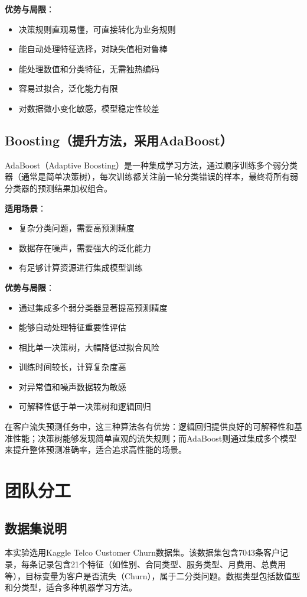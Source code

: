 \documentclass[12pt,a4paper]{article}
\begin{document}
\textbf{优势与局限}：
\begin{itemize}
    \item 决策规则直观易懂，可直接转化为业务规则
    \item 能自动处理特征选择，对缺失值相对鲁棒
    \item 能处理数值和分类特征，无需独热编码
    \item 容易过拟合，泛化能力有限
    \item 对数据微小变化敏感，模型稳定性较差
\end{itemize}

\subsection{Boosting（提升方法，采用AdaBoost）}
AdaBoost（Adaptive Boosting）是一种集成学习方法，通过顺序训练多个弱分类器（通常是简单决策树），每次训练都关注前一轮分类错误的样本，最终将所有弱分类器的预测结果加权组合。

\textbf{适用场景}：
\begin{itemize}
    \item 复杂分类问题，需要高预测精度
    \item 数据存在噪声，需要强大的泛化能力
    \item 有足够计算资源进行集成模型训练
\end{itemize}

\textbf{优势与局限}：
\begin{itemize}
    \item 通过集成多个弱分类器显著提高预测精度
    \item 能够自动处理特征重要性评估
    \item 相比单一决策树，大幅降低过拟合风险
    \item 训练时间较长，计算复杂度高
    \item 对异常值和噪声数据较为敏感
    \item 可解释性低于单一决策树和逻辑回归
\end{itemize}

在客户流失预测任务中，这三种算法各有优势：逻辑回归提供良好的可解释性和基准性能；决策树能够发现简单直观的流失规则；而AdaBoost则通过集成多个模型来提升整体预测准确率，适合追求高性能的场景。

\section{团队分工}

\subsection{数据集说明}
本实验选用Kaggle Telco Customer Churn数据集。该数据集包含7043条客户记录，每条记录包含21个特征（如性别、合同类型、服务类型、月费用、总费用等），目标变量为客户是否流失（Churn），属于二分类问题。数据类型包括数值型和分类型，适合多种机器学习方法。
\end{document}
